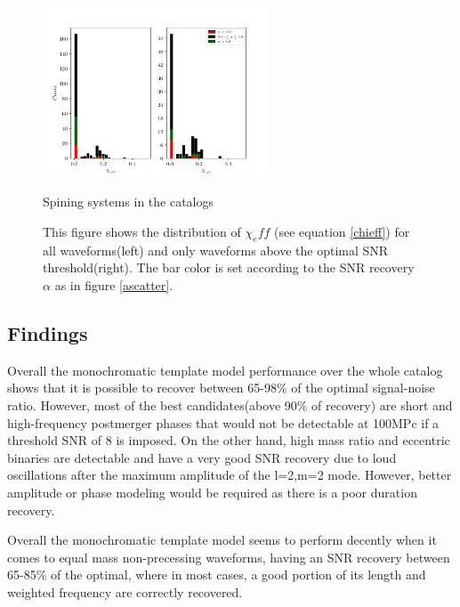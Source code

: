 \begin{figure}[hbt!]
\begin{center}
\includegraphics[width=0.6\textwidth, angle=0]{images/Data_analysis/results/alpha_chihist.pdf}
\captionsetup{width=0.8\textwidth}
\caption{Spining systems in the catalogs}
\caption*{This figure shows the distribution of $\chi_eff$ (see equation \ref{chieff}) for all waveforms(left) and only waveforms above the optimal SNR threshold(right). The bar color is set according to the SNR recovery $\alpha$ as in figure \ref{ascatter}.}
\label{achihist}
\end{center}
\end{figure}

\FloatBarrier

\subsection*{Findings}

Overall the monochromatic template model performance over the whole catalog shows that it is possible to recover between 65-98\% of the optimal signal-noise ratio. However, most of the best candidates(above 90\% of recovery) are short and high-frequency postmerger phases that would not be detectable at 100MPc if a threshold SNR of 8 is imposed. On the other hand, high mass ratio and eccentric binaries are detectable and have a very good SNR recovery due to loud oscillations after the maximum amplitude of the l=2,m=2 mode. However, better amplitude or phase modeling would be required as there is a poor duration recovery.

Overall the monochromatic template model seems to perform decently when it comes to equal mass non-precessing waveforms, having an SNR recovery between 65-85\% of the optimal, where in most cases, a good portion of its length and weighted frequency are correctly recovered.

